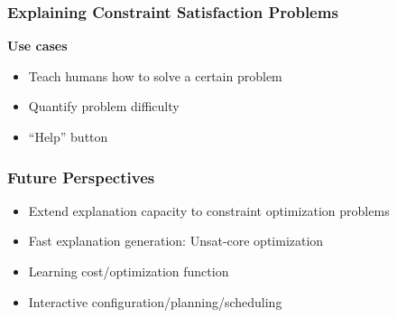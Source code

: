 \documentclass{beamer}
\begin{document}

\begin{frame}
    \frametitle{\small{Explaining Constraint Satisfaction Problems}}
    \textbf{Use cases}
    \begin{itemize}
        \item Teach humans how to solve a certain problem
        \item Quantify problem difficulty
        \item “Help” button
    \end{itemize}

\end{frame}

\begin{frame}
    \frametitle{\small{Future Perspectives}}

    \begin{itemize}
        \item Extend explanation capacity to constraint optimization problems
        \item Fast explanation generation: Unsat-core optimization
        \item Learning cost/optimization function
        \item Interactive configuration/planning/scheduling
    \end{itemize}

\end{frame}
\end{document}
